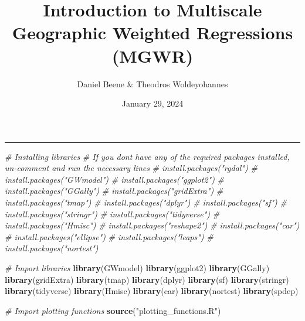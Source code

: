 \documentclass[
  12pt,
]{article}
\title{Introduction to Multiscale Geographic Weighted Regressions
(MGWR)}
\author{Daniel Beene \& Theodros Woldeyohannes}
\date{January 29, 2024}
\newenvironment{Shaded}{\begin{snugshade}}{\end{snugshade}}
\newcommand{\CommentTok}[1]{\textcolor[rgb]{0.56,0.35,0.01}{\textit{#1}}}
\newcommand{\FunctionTok}[1]{\textcolor[rgb]{0.13,0.29,0.53}{\textbf{#1}}}
\newcommand{\NormalTok}[1]{#1}
\newcommand{\StringTok}[1]{\textcolor[rgb]{0.31,0.60,0.02}{#1}}
\begin{document}
\maketitle

\begin{center}\rule{0.5\linewidth}{0.5pt}\end{center}

\begin{Shaded}
\begin{Highlighting}[]
\CommentTok{\# Installing libraries}
\CommentTok{\# If you don\textquotesingle{}t have any of the required packages installed, un{-}comment and run the necessary lines}
\CommentTok{\# install.packages("rgdal")}
\CommentTok{\# install.packages("GWmodel")}
\CommentTok{\# install.packages("ggplot2")}
\CommentTok{\# install.packages("GGally")}
\CommentTok{\# install.packages("gridExtra")}
\CommentTok{\# install.packages("tmap")}
\CommentTok{\# install.packages("dplyr")}
\CommentTok{\# install.packages("sf")}
\CommentTok{\# install.packages("stringr")}
\CommentTok{\# install.packages("tidyverse")}
\CommentTok{\# install.packages("Hmisc")}
\CommentTok{\# install.packages("reshape2")}
\CommentTok{\# install.packages("car")}
\CommentTok{\# install.packages("ellipse")}
\CommentTok{\# install.packages("leaps")}
\CommentTok{\# install.packages("nortest")}
\end{Highlighting}
\end{Shaded}

\begin{Shaded}
\begin{Highlighting}[]
\CommentTok{\# Import libraries}
\FunctionTok{library}\NormalTok{(GWmodel)}
\FunctionTok{library}\NormalTok{(ggplot2)}
\FunctionTok{library}\NormalTok{(GGally)}
\FunctionTok{library}\NormalTok{(gridExtra)}
\FunctionTok{library}\NormalTok{(tmap)}
\FunctionTok{library}\NormalTok{(dplyr)}
\FunctionTok{library}\NormalTok{(sf)}
\FunctionTok{library}\NormalTok{(stringr)}
\FunctionTok{library}\NormalTok{(tidyverse)}
\FunctionTok{library}\NormalTok{(Hmisc)}
\FunctionTok{library}\NormalTok{(car)}
\FunctionTok{library}\NormalTok{(nortest)}
\FunctionTok{library}\NormalTok{(spdep)}

\CommentTok{\# Import plotting functions}
\FunctionTok{source}\NormalTok{(}\StringTok{"plotting\_functions.R"}\NormalTok{)}
\end{Highlighting}
\end{Shaded}
\end{document}
